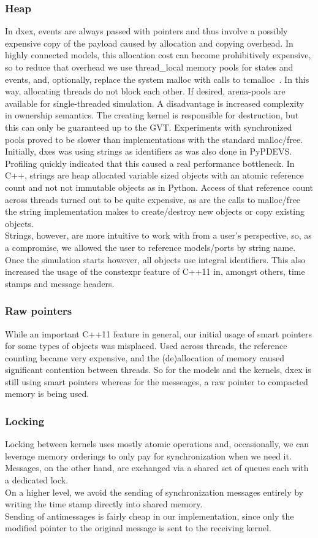 \subsubsection{Heap}
In dxex, events are always passed with pointers and thus involve a possibly expensive copy of the payload caused by allocation and copying overhead. In highly connected models, this allocation cost can become prohibitively expensive, so to reduce that overhead we use thread\_local memory pools for states and events, and, optionally, replace the system malloc with calls to tcmalloc~\cite{tcmalloc}. In this way, allocating threads do not block each other. If desired, arena-pools are available for single-threaded simulation. A disadvantage is increased complexity in ownership semantics. The creating kernel is responsible for destruction, but this can only be guaranteed up to the GVT. Experiments with synchronized pools proved to be slower than implementations with the standard malloc/free.\\
Initially, dxes was using strings as identifiers as was also done in PyPDEVS. Profiling quickly indicated that this caused a real performance bottleneck. In C++, strings are heap allocated variable sized objects with an atomic reference count and not not immutable objects as in Python. Access of that reference count across threads turned out to be quite expensive, as are the calls to malloc/free the string implementation makes to create/destroy new objects or copy existing objects.\\
Strings, however, are more intuitive to work with from a user's perspective, so, as a compromise, we allowed the user to reference models/ports by string name. Once the simulation starts however, all objects use integral identifiers. This also increased the usage of the constexpr feature of C++11 in, amongst others, time stamps and message headers.
\subsubsection{Raw pointers}
While an important C++11 feature in general, our initial usage of smart pointers for some types of objects was misplaced. Used across threads, the reference counting became very expensive, and the (de)allocation of memory caused significant contention between threads. So for the models and the kernels, dxex is still using smart pointers whereas for the messeages, a raw pointer to compacted memory is being used. 
\subsubsection{Locking}
Locking between kernels uses mostly atomic operations and, occasionally, we can leverage memory orderings to only pay for synchronization when we need it. Messages, on the other hand, are exchanged via a shared set of queues each with a dedicated lock.\\
On a higher level, we avoid the sending of synchronization messages entirely by writing the time stamp directly into shared memory.\\ Sending of antimessages is fairly cheap in our implementation, since only the modified pointer to the original message is sent to the receiving kernel.
